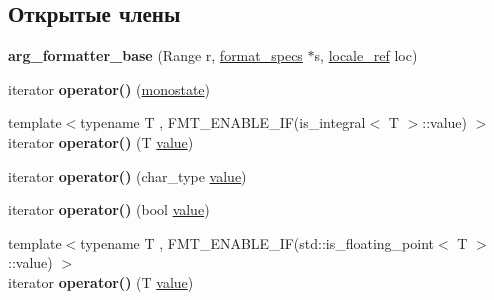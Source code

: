 \subsection*{Открытые члены}
\begin{DoxyCompactItemize}
\item 
\mbox{\label{classinternal_1_1arg__formatter__base_acb302e3dd547282e48af7ab78c55d733}} 
{\bfseries arg\+\_\+formatter\+\_\+base} (Range r, \hyperlink{structbasic__format__specs}{format\+\_\+specs} $\ast$s, \hyperlink{classinternal_1_1locale__ref}{locale\+\_\+ref} loc)
\item 
\mbox{\label{classinternal_1_1arg__formatter__base_a21074f43ff793b9f4a16e5f725c17684}} 
iterator {\bfseries operator()} (\hyperlink{structmonostate}{monostate})
\item 
\mbox{\label{classinternal_1_1arg__formatter__base_a4f333f2828e3e0c55c02d30b863994f8}} 
{\footnotesize template$<$typename T , F\+M\+T\+\_\+\+E\+N\+A\+B\+L\+E\+\_\+\+I\+F(is\+\_\+integral$<$ T $>$\+::value) $>$ }\\iterator {\bfseries operator()} (T \hyperlink{classinternal_1_1value}{value})
\item 
\mbox{\label{classinternal_1_1arg__formatter__base_a96a1641c6524bbd53c0de2793296bdfc}} 
iterator {\bfseries operator()} (char\+\_\+type \hyperlink{classinternal_1_1value}{value})
\item 
\mbox{\label{classinternal_1_1arg__formatter__base_a383e770d1976bdfc5215557f2fc31f36}} 
iterator {\bfseries operator()} (bool \hyperlink{classinternal_1_1value}{value})
\item 
\mbox{\label{classinternal_1_1arg__formatter__base_a4f333f2828e3e0c55c02d30b863994f8}} 
{\footnotesize template$<$typename T , F\+M\+T\+\_\+\+E\+N\+A\+B\+L\+E\+\_\+\+I\+F(std\+::is\+\_\+floating\+\_\+point$<$ T $>$\+::value) $>$ }\\iterator {\bfseries operator()} (T \hyperlink{classinternal_1_1value}{value})
\item 
\mbox{\label{classinternal_1_1arg__formatter__base_ab52f46c28768d20b6ebf677ad382071a}} 

\end{DoxyCompactItemize}
